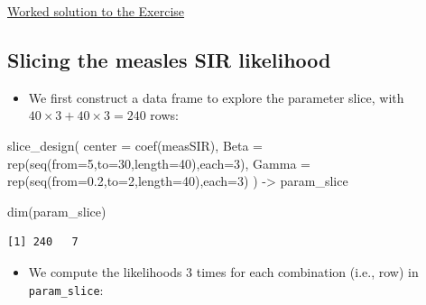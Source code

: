\documentclass[
  letterpaper,
  DIV=11,
  numbers=noendperiod]{scrartcl}
\newenvironment{Shaded}{\begin{snugshade}}{\end{snugshade}}
\newcommand{\AttributeTok}[1]{\textcolor[rgb]{0.40,0.45,0.13}{#1}}
\newcommand{\DecValTok}[1]{\textcolor[rgb]{0.68,0.00,0.00}{#1}}
\newcommand{\FloatTok}[1]{\textcolor[rgb]{0.68,0.00,0.00}{#1}}
\newcommand{\FunctionTok}[1]{\textcolor[rgb]{0.28,0.35,0.67}{#1}}
\newcommand{\NormalTok}[1]{\textcolor[rgb]{0.00,0.23,0.31}{#1}}
\newcommand{\OtherTok}[1]{\textcolor[rgb]{0.00,0.23,0.31}{#1}}
\providecommand{\tightlist}{%
  \setlength{\itemsep}{0pt}\setlength{\parskip}{0pt}}\usepackage{longtable,booktabs,array}
\begin{document}
\vspace{3mm}

\href{./Q_slice.html}{Worked solution to the Exercise}

\hypertarget{slicing-the-measles-sir-likelihood}{%
\subsection{Slicing the measles SIR
likelihood}\label{slicing-the-measles-sir-likelihood}}

\begin{itemize}
\tightlist
\item
  We first construct a data frame to explore the parameter slice, with
  \(40\times 3+40\times 3=240\) rows:
\end{itemize}

\begin{Shaded}
\begin{Highlighting}[]
\FunctionTok{slice\_design}\NormalTok{(}
  \AttributeTok{center =} \FunctionTok{coef}\NormalTok{(measSIR),}
  \AttributeTok{Beta =} \FunctionTok{rep}\NormalTok{(}\FunctionTok{seq}\NormalTok{(}\AttributeTok{from=}\DecValTok{5}\NormalTok{,}\AttributeTok{to=}\DecValTok{30}\NormalTok{,}\AttributeTok{length=}\DecValTok{40}\NormalTok{),}\AttributeTok{each=}\DecValTok{3}\NormalTok{),}
  \AttributeTok{Gamma =} \FunctionTok{rep}\NormalTok{(}\FunctionTok{seq}\NormalTok{(}\AttributeTok{from=}\FloatTok{0.2}\NormalTok{,}\AttributeTok{to=}\DecValTok{2}\NormalTok{,}\AttributeTok{length=}\DecValTok{40}\NormalTok{),}\AttributeTok{each=}\DecValTok{3}\NormalTok{)}
\NormalTok{) }\OtherTok{{-}\textgreater{}}\NormalTok{ param\_slice}

\FunctionTok{dim}\NormalTok{(param\_slice)}
\end{Highlighting}
\end{Shaded}

\begin{verbatim}
[1] 240   7
\end{verbatim}

\framebreak

\begin{itemize}
\tightlist
\item
  We compute the likelihoods \(3\) times for each combination (i.e.,
  row) in \texttt{param\_slice}:
\end{itemize}
\end{document}
